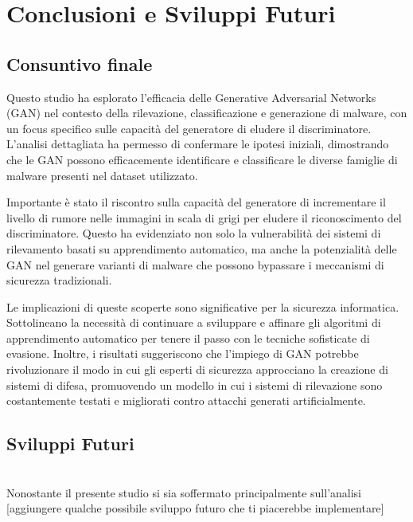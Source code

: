 \chapter{Conclusioni e Sviluppi Futuri}
\label{cap:conclusioni}

\section{Consuntivo finale}
Questo studio ha esplorato l'efficacia delle Generative Adversarial Networks (GAN) nel contesto della rilevazione, classificazione e generazione di malware, con un focus specifico sulle capacità del generatore di eludere il discriminatore. L'analisi dettagliata ha permesso di confermare le ipotesi iniziali, dimostrando che le GAN possono efficacemente identificare e classificare le diverse famiglie di malware presenti nel dataset utilizzato.

Importante è stato il riscontro sulla capacità del generatore di incrementare il livello di rumore nelle immagini in scala di grigi per eludere il riconoscimento del discriminatore. Questo ha evidenziato non solo la vulnerabilità dei sistemi di rilevamento basati su apprendimento automatico, ma anche la potenzialità delle GAN nel generare varianti di malware che possono bypassare i meccanismi di sicurezza tradizionali.

Le implicazioni di queste scoperte sono significative per la sicurezza informatica. Sottolineano la necessità di continuare a sviluppare e affinare gli algoritmi di apprendimento automatico per tenere il passo con le tecniche sofisticate di evasione. Inoltre, i risultati suggeriscono che l'impiego di GAN potrebbe rivoluzionare il modo in cui gli esperti di sicurezza approcciano la creazione di sistemi di difesa, promuovendo un modello in cui i sistemi di rilevazione sono costantemente testati e migliorati contro attacchi generati artificialmente.
 

\section{Sviluppi Futuri}
~\\
\indent Nonostante il presente studio si sia soffermato principalmente sull'analisi 
[aggiungere qualche possibile sviluppo futuro che ti piacerebbe implementare]

